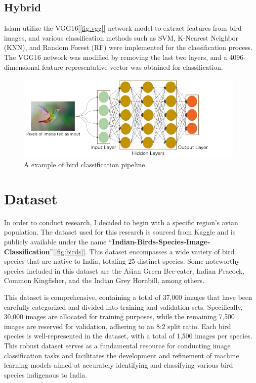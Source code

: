\documentclass[10pt,twocolumn,letterpaper]{article}
\begin{document}
\subsection{Hybrid}
Islam \etal\cite{islam2019bird} utilize the VGG16\cite{simonyan2014very}[\ref{fig:vgg}] network model to extract features from bird images, and various classification methods such as SVM\cite{suthaharan2016support}, K-Nearest Neighbor (KNN), and Random Forest (RF) were implemented for the classification process. The VGG16 network was modified by removing the last two layers, and a 4096-dimensional feature representative vector was obtained for classification.
\begin{figure}[t]
	\centering
	\includegraphics[width=\columnwidth]{cnn}
	\caption{A example of bird classification pipeline.}
	\label{fig:cnn}
\end{figure}

\section{Dataset}
\label{sec:dataset}
In order to conduct research, I decided to begin with a specific region's avian population. The dataset used for this research is sourced from Kaggle and is publicly available under the name ``\textbf{Indian-Birds-Species-Image-Classification}''[\ref{fig:birds}]. This dataset encompasses a wide variety of bird species that are native to India, totaling 25 distinct species. Some noteworthy species included in this dataset are the Asian Green Bee-eater, Indian Peacock, Common Kingfisher, and the Indian Grey Hornbill, among others.

This dataset is comprehensive, containing a total of 37,000 images that have been carefully categorized and divided into training and validation sets. Specifically, 30,000 images are allocated for training purposes, while the remaining 7,500 images are reserved for validation, adhering to an 8:2 split ratio. Each bird species is well-represented in the dataset, with a total of 1,500 images per species. This robust dataset serves as a fundamental resource for conducting image classification tasks and facilitates the development and refinement of machine learning models aimed at accurately identifying and classifying various bird species indigenous to India.
\end{document}

